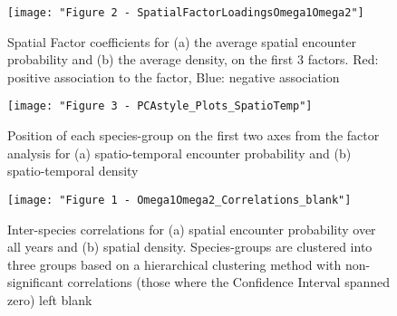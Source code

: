 \documentclass{nature}
\begin{document}





\begin{figure}
\begin{center}
	\texttt{[image: "Figure 2 - SpatialFactorLoadingsOmega1Omega2"]}
	\label{fig:1}
	\caption{Spatial Factor coefficients for (a) the average spatial encounter
		probability and (b) the average density,  on the first 3
		factors. Red: positive association to the factor, Blue:
		negative association}
\end{center}
\end{figure}


\begin{figure}
\begin{center}
	\texttt{[image: "Figure 3 - PCAstyle\_Plots\_SpatioTemp"]}
	\label{fig:2}
	\caption{Position of each species-group on the first two axes from the
		factor analysis for (a) spatio-temporal encounter probability
		and (b) spatio-temporal density}
\end{center}
\end{figure}

\begin{figure}
\begin{center}
	\texttt{[image: "Figure 1 - Omega1Omega2\_Correlations\_blank"]}
	\label{fig:3}
	\caption{Inter-species correlations for (a) spatial encounter
		probability over all years and (b) spatial density.
		Species-groups are clustered into three groups based on a
		hierarchical clustering method with non-significant
		correlations (those where the Confidence Interval spanned zero)
		left blank}
	\end{center}
\end{figure}
\end{document}
